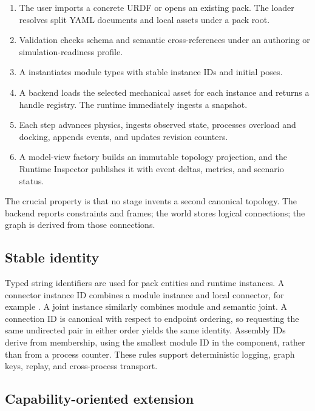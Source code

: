 \begin{enumerate}
  \item The user imports a concrete URDF or opens an existing pack. The loader resolves
        split YAML documents and local assets under a pack root.
  \item Validation checks schema and semantic cross-references under an authoring or
        simulation-readiness profile.
  \item A  instantiates module types with stable instance IDs and initial
        poses.
  \item A backend loads the selected mechanical asset for each instance and returns a
        handle registry. The runtime immediately ingests a snapshot.
  \item Each step advances physics, ingests observed state, processes overload and
        docking, appends events, and updates revision counters.
  \item A model-view factory builds an immutable topology projection, and the Runtime
        Inspector publishes it with event deltas, metrics, and scenario status.
\end{enumerate}

The crucial property is that no stage invents a second canonical topology. The backend
reports constraints and frames; the world stores logical connections; the graph is
derived from those connections.

\subsection{Stable identity}

Typed string identifiers are used for pack entities and runtime instances. A connector
instance ID combines a module instance and local connector, for example
. A joint instance similarly combines module and semantic joint.
A connection ID is canonical with respect to endpoint ordering, so requesting the same
undirected pair in either order yields the same identity. Assembly IDs derive from
membership, using the smallest module ID in the component, rather than from a process
counter. These rules support deterministic logging, graph keys, replay, and
cross-process transport.

\subsection{Capability-oriented extension}

